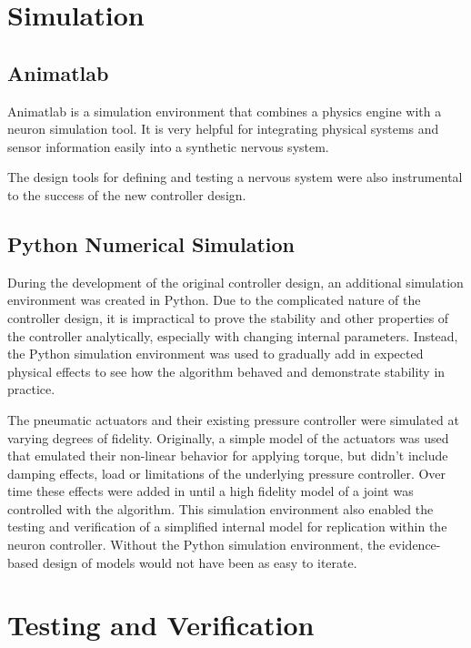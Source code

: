 \section{Simulation}

\subsection{Animatlab}

Animatlab is a simulation environment that combines a physics engine with a
neuron simulation tool. It is very helpful for integrating physical systems
and sensor information easily into a synthetic nervous system.

The design tools for defining and testing a nervous system were also instrumental
to the success of the new controller design.

\subsection{Python Numerical Simulation}

During the development of the original controller design, an additional
simulation environment was created in Python. Due to the complicated nature of
the controller design, it is impractical to prove the stability and other
properties of the controller analytically, especially with changing internal
parameters. Instead, the Python simulation environment was used to gradually add
in expected physical effects to see how the algorithm behaved and demonstrate
stability in practice.

The pneumatic actuators and their existing pressure controller were simulated 
at varying degrees of fidelity. Originally, a simple model of the actuators
was used that emulated their non-linear behavior for applying torque, but didn't
include damping effects, load or limitations of the underlying pressure
controller. Over time these effects were added in until a high fidelity model of
a joint was controlled with the algorithm. This simulation environment also
enabled the testing and verification of a simplified internal model for
replication within the neuron controller. Without the Python simulation
environment, the evidence-based design of models would not have been as easy to
iterate.

\section{Testing and Verification}

